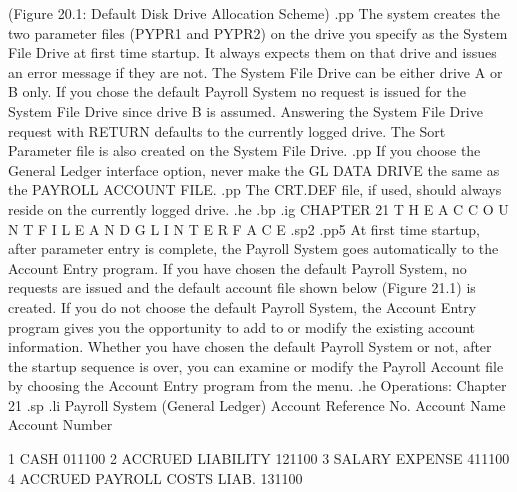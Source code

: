 	(Figure 20.1: Default Disk Drive Allocation Scheme)
.pp
The system creates the two parameter files (PYPR1 and PYPR2)
on the drive you specify
as the System File Drive at first time startup.  It always expects them
on that drive and issues an error message if they are not.  The
System File Drive can be either drive A or B only.  If you chose
the default Payroll System no request is issued for the System File Drive
since drive B is assumed.
Answering the System File Drive request with RETURN defaults to the
currently logged drive. The Sort Parameter file is also created on the
System File Drive.
.pp
If you choose the General Ledger interface option,
never make the GL DATA DRIVE the same as the PAYROLL ACCOUNT FILE.
.pp
The CRT.DEF file, if used, should always reside on the currently logged
drive.
.he
.bp
.ig
CHAPTER 21
T H E	 A C C O U N T	  F I L E
A N D	 G L	I N T E R F A C E
.sp2
.pp5
At first time startup, after parameter entry is complete, the Payroll
System goes automatically to the Account Entry program.  If you
have chosen the default Payroll System, no requests are issued and
the default account file shown below (Figure 21.1) is created.	If you
do not choose the default Payroll System, the Account Entry program gives
you the opportunity to add to or modify the existing account information.
Whether you have chosen the default Payroll System or not, after the
startup sequence is over, you can examine or modify the Payroll Account
file by choosing the Account Entry program from the menu.
.he Operations: Chapter 21
.sp
.li
    Payroll System			       (General Ledger)
 Account Reference No.	    Account Name	Account Number

	1	       CASH			    011100
	2	       ACCRUED LIABILITY	    121100
	3	       SALARY EXPENSE		    411100
	4	       ACCRUED PAYROLL COSTS LIAB.  131100

